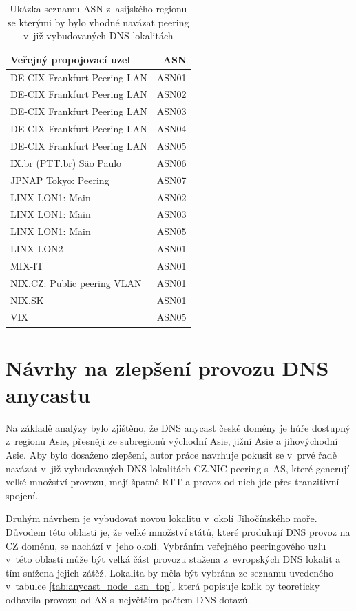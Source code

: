 \documentclass[thesis=M,czech]{src/FITthesis}[2019/12/23]
\begin{document}
\begin{table}
\centering
\begin{tabular}{lr}
\toprule
     Veřejný propojovací uzel  & ASN \\
\midrule
DE-CIX Frankfurt Peering LAN & ASN01      \\  
DE-CIX Frankfurt Peering LAN & ASN02       \\  
DE-CIX Frankfurt Peering LAN & ASN03       \\  
DE-CIX Frankfurt Peering LAN & ASN04       \\  
DE-CIX Frankfurt Peering LAN & ASN05       \\  
    IX.br (PTT.br) São Paulo & ASN06     \\  
        JPNAP Tokyo: Peering & ASN07       \\  
             LINX LON1: Main & ASN02       \\  
             LINX LON1: Main & ASN03       \\  
             LINX LON1: Main & ASN05       \\  
                   LINX LON2 & ASN01      \\  
                      MIX-IT & ASN01      \\  
 NIX.CZ: Public peering VLAN & ASN01      \\  
                      NIX.SK & ASN01      \\  
                         VIX & ASN05       \\
\bottomrule
\end{tabular}
 	\caption[]{Ukázka seznamu ASN z~asijského regionu se kterými by bylo vhodné navázat peering v~již vybudovaných DNS lokalitách} 
 	\label{tab:anycast_improve}
\end{table}




\section{Návrhy na zlepšení provozu DNS anycastu}
Na základě analýzy bylo zjištěno, že DNS anycast české domény je hůře dostupný z~regionu Asie, přesněji ze subregionů východní Asie, jižní Asie a jihovýchodní Asie. Aby bylo dosaženo zlepšení, autor práce navrhuje pokusit se v~prvé řadě navázat v~již vybudovaných DNS lokalitách CZ.NIC peering s~AS, které generují velké množství provozu, mají špatné RTT a provoz od nich jde přes tranzitivní spojení.

Druhým návrhem je vybudovat novou lokalitu v~okolí Jihočínského moře. Důvodem této oblasti je, že velké množství států, které produkují DNS provoz na CZ doménu, se nachází v~jeho okolí. Vybráním veřejného peeringového uzlu v~této oblasti může být velká část provozu stažena z~evropských DNS lokalit a tím snížena jejich zátěž. Lokalita by měla být vybrána ze seznamu uvedeného v~tabulce \ref{tab:anycast_node_asn_top}, která popisuje kolik by teoreticky odbavila provozu od AS s~největším počtem DNS dotazů.
\end{document}
